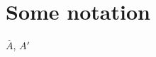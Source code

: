 \appendix
\renewcommand{\chaptermark}[1]%
	{\markboth{Appendix \thechapter. #1}{}}
\setcounter{chapter}{3}
\chapter{Some notation}

$\overline{A}$, $A'$
\label{appendixD}

\begin{comment}

\noindent The design and linking structure of the two lessons is described here.
\section{Lesson 1}
Lesson 1 was developed in Shockwave Flash using 17 linked pages.  
In this discussion we refer to the main page as the home page and 
represent it in the diagrams with the symbol \raisebox{-3pt}[0pt][0pt]{\texttt{[image: figures/home]}}. 
Figure~\ref{lesson1-12-13-34} shows the links to the introduction 
and to Part 1 of Lesson 1.
\begin{figure}[ht]
\begin{center}
\texttt{[image: figures/lesson1-12-13-34]}
\caption{The main links leaving from the home page and the links to and from Part 1.}\label{lesson1-12-13-34}
\end{center}
\end{figure}
Every page has a banner with five buttons.  Since Dari is written 
from the right to the left these buttons are arranged in order from 
the right to the left.  The first button returns to the home page, or 
exits from the application when the user is on the home page. 
 The other four buttons link to one of the four parts of the lesson, 
i.e.\ Part 1---set description, Part 2---the universal set and the 
empty set, Part 3---union, intersection, and difference, and Part 
4---the distributive and associative laws.  By clicking on any of 
these buttons the user is sent to the main page of the selected lesson.
Each of the four parts in our illustrations is marked similarly to 
the home page using one of the 
symbols \raisebox{-3pt}[0pt][0pt]{\texttt{[image: figures/parts1234]}} 
\begin{figure}[ht]
\begin{center}
\texttt{[image: figures/lesson1-56]}
\caption{Part 2---the universal and empty sets}\label{lesson1-56}
\end{center}
\end{figure}
Figure~\ref{lesson1-56} shows Part 2 where set the empty set, written 
as `$\emptyset$' and the universal set, written as `\textsf{U}', and 
their relationships are discussed.  All the 
buttons in the banners function the same as usual, i.e.\ the first 
button---on the right---points to the home page, and each of the other buttons 
points to the introductory page of its part.   Each of the introductory pages 
always links to a page of comprehensive examples topically related to the 
introductory page.


\end{comment}
